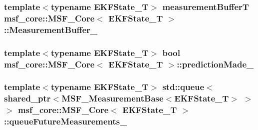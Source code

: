 \hypertarget{classmsf__core_1_1MSF__Core_a3e1a3bbacae4dbb01bb0d3f9d415870e}{
\subsubsection[{Measurement\-Buffer\-\_\-}]{\setlength{\rightskip}{0pt plus 5cm}template$<$typename E\-K\-F\-State\-\_\-\-T$>$ {\bf measurement\-Buffer\-T} {\bf msf\-\_\-core\-::\-M\-S\-F\-\_\-\-Core}$<$ E\-K\-F\-State\-\_\-\-T $>$\-::Measurement\-Buffer\-\_\-\hspace{0.3cm}{\ttfamily [private]}}}\label{classmsf__core_1_1MSF__Core_a3e1a3bbacae4dbb01bb0d3f9d415870e}
\hypertarget{classmsf__core_1_1MSF__Core_a545ca557edba6ceb0cdb31adfe0df709}{
\subsubsection[{prediction\-Made\-\_\-}]{\setlength{\rightskip}{0pt plus 5cm}template$<$typename E\-K\-F\-State\-\_\-\-T$>$ bool {\bf msf\-\_\-core\-::\-M\-S\-F\-\_\-\-Core}$<$ E\-K\-F\-State\-\_\-\-T $>$\-::prediction\-Made\-\_\-\hspace{0.3cm}{\ttfamily [private]}}}\label{classmsf__core_1_1MSF__Core_a545ca557edba6ceb0cdb31adfe0df709}
\hypertarget{classmsf__core_1_1MSF__Core_a71ec97d583c23110fb4224888183094d}{
\subsubsection[{queue\-Future\-Measurements\-\_\-}]{\setlength{\rightskip}{0pt plus 5cm}template$<$typename E\-K\-F\-State\-\_\-\-T$>$ std\-::queue$<$shared\-\_\-ptr$<${\bf M\-S\-F\-\_\-\-Measurement\-Base}$<$E\-K\-F\-State\-\_\-\-T$>$ $>$ $>$ {\bf msf\-\_\-core\-::\-M\-S\-F\-\_\-\-Core}$<$ E\-K\-F\-State\-\_\-\-T $>$\-::queue\-Future\-Measurements\-\_\-\hspace{0.3cm}{\ttfamily [private]}}}\label{classmsf__core_1_1MSF__Core_a71ec97d583c23110fb4224888183094d}
